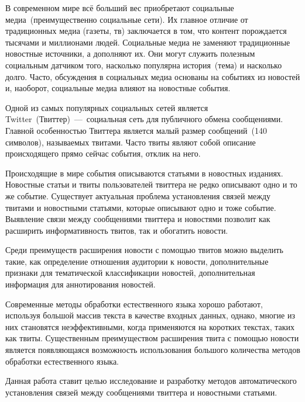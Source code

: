 \introductiontitle
    В современном мире всё больший вес приобретают социальные медиа~(преимущественно социальные сети).
    Их главное отличие от традиционных медиа (газеты, тв) заключается в том, что контент порождается тысячами и миллионами людей.
    Социальные медиа не заменяют традиционные новостные источники, а дополняют их.
    Они могут служить полезным социальным датчиком того, насколько популярна история~(тема) и насколько долго.
    Часто, обсуждения в социальных медиа основаны на событиях из новостей и, наоборот, социальные медиа влияют на новостные события.

    Одной из самых популярных социальных сетей является Twitter~(Твиттер)~---~социальная сеть для публичного обмена сообщениями.
    Главной особенностью Твиттера является малый размер сообщений~(140 символов), называемых твитами.
    Часто твиты являют собой описание происходящего прямо сейчас события, отклик на него.

    Происходящие в мире события описываются статьями в новостных изданиях.
    Новостные статьи и твиты пользователей твиттера не редко описывают одно и то же событие.
    Существует актуальная проблема установления связей между твитами и новостными статьями, которые описывают одно и тоже событие.
    Выявление связи между сообщениями твиттера и новостями позволит как расширить информативность твитов, так и обогатить новости.

    Среди преимуществ расширения новости с помощью твитов можно выделить такие, как определение отношения аудитории к новости,
    дополнительные признаки для тематической классификации новостей, дополнительная информация для аннотирования новостей.

    Современные методы обработки естественного языка хорошо работают, используя большой массив текста в качестве входных данных, однако, многие из них становятся неэффективными,
    когда применяются на коротких текстах, таких как твиты.
    Существенным преимуществом расширения твита с помощью новости является появляющаяся возможность использования большого количества методов обработки естественного языка.

    Данная работа ставит целью исследование и разработку методов автоматического установления связей между сообщениями твиттера и новостными статьями.

    \clearpage